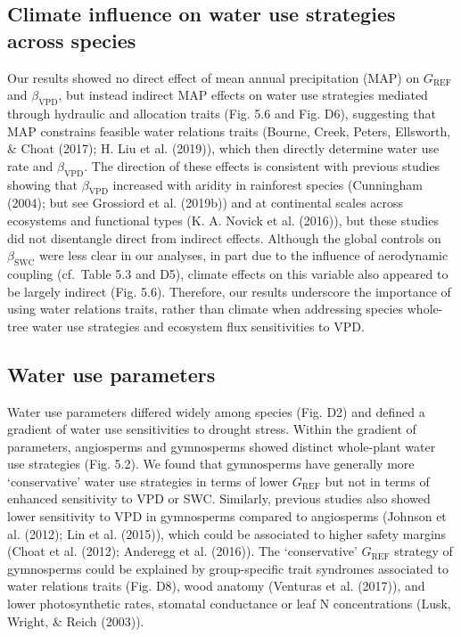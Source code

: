 \documentclass[11pt,twoside]{reedthesis}
\begin{document}
\subsection{Climate influence on water use strategies across
species}\label{climate-influence-on-water-use-strategies-across-species}

Our results showed no direct effect of mean annual precipitation (MAP)
on \(G_{\text{REF}}\) and \(\beta_{\text{VPD}}\), but instead indirect
MAP effects on water use strategies mediated through hydraulic and
allocation traits (Fig. 5.6 and Fig. D6), suggesting that MAP constrains
feasible water relations traits (Bourne, Creek, Peters, Ellsworth, \&
Choat (2017); H. Liu et al. (2019)), which then directly determine water
use rate and \(\beta_{\text{VPD}}\). The direction of these effects is
consistent with previous studies showing that \(\beta_{\text{VPD}}\)
increased with aridity in rainforest species (Cunningham (2004); but see
Grossiord et al. (2019b)) and at continental scales across ecosystems
and functional types (K. A. Novick et al. (2016)), but these studies did
not disentangle direct from indirect effects. Although the global
controls on \(\beta_{\text{SWC}}\) were less clear in our analyses, in
part due to the influence of aerodynamic coupling (cf.~Table 5.3 and
D5), climate effects on this variable also appeared to be largely
indirect (Fig. 5.6). Therefore, our results underscore the importance of
using water relations traits, rather than climate when addressing
species whole-tree water use strategies and ecosystem flux sensitivities
to VPD.\par

\subsection{Water use parameters}\label{water-use-parameters}

Water use parameters differed widely among species (Fig. D2) and defined
a gradient of water use sensitivities to drought stress. Within the
gradient of parameters, angiosperms and gymnosperms showed distinct
whole-plant water use strategies (Fig. 5.2). We found that gymnosperms
have generally more `conservative' water use strategies in terms of
lower \(G_{\text{REF}}\) but not in terms of enhanced sensitivity to VPD
or SWC. Similarly, previous studies also showed lower sensitivity to VPD
in gymnosperms compared to angiosperms (Johnson et al. (2012); Lin et
al. (2015)), which could be associated to higher safety margins (Choat
et al. (2012); Anderegg et al. (2016)). The `conservative'
\(G_{\text{REF}}\) strategy of gymnosperms could be explained by
group-specific trait syndromes associated to water relations traits
(Fig. D8), wood anatomy (Venturas et al. (2017)), and lower
photosynthetic rates, stomatal conductance or leaf N concentrations
(Lusk, Wright, \& Reich (2003)).\par
\end{document}
